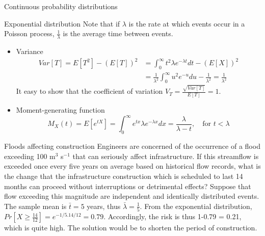 \documentclass[8pt]{beamer}
\renewcommand{\emph}[1]{\textcolor{myorange}{#1}}
\begin{document}
\begin{frame}{Continuous probability distributions}
    \begin{block}{\alert{Exponential} distribution}
                Note that if $\lambda$ is the rate at which events occur in a \emph{Poisson process}, $\frac{1}{\lambda}$ is the average time between events. 
       \begin{itemize}
            \item \emph{Variance}
                \vspace{-5pt}
         \begin{align*}
             \displaystyle
             Var[T] = E[T^2] - \left( E[T] \right)^2 &= \int_0^\infty t^2 \lambda e^{-\lambda t} dt - \left( E[X] \right)^2  \\
                                                     &= \frac{1}{\lambda^2} \int_0^\infty u^2 e^{-u} du - \frac{1}{\lambda^2} = \frac{1}{\lambda^2}
         \end{align*}
                \vspace{-5pt}
         It easy to show that  the \emph{coefficient of variation} $V_T = \frac{\sqrt{Var[T]}}{E[T]} = 1$.

    \item \emph{Moment-generating function}
                \vspace{-5pt}
\[
    M_X (t) = E \left[e^{tX} \right] = \int_0^\infty e^{tx} \lambda e^{-\lambda x} dx = \frac{\lambda}{\lambda - t}, \quad \text{for } t < \lambda 
\]
       \end{itemize}
    \end{block}
                \vspace{-10pt}
     \begin{exampleblock}{Floods affecting construction}
         Engineers are concerned of the occurrence of a flood exceeding 100 m$^3$ s$^{-1}$ that can seriously affect infrastructure. If this streamflow is exceeded once every five years on average based on historical flow records, what is the change that the infrastructure construction which is scheduled to last 14 months can proceed without interruptions or detrimental effects? 
         Suppose that flow exceeding this magnitude are independent and identically distributed events. The sample mean is $\bar{t} = 5$ years, thus $\bar{\lambda} = \frac{1}{5}$. From the exponential distribution, $Pr \left[ X \geq \frac{14}{12} \right] = e^{-1/5 . 14/12} = 0.79$. Accordingly, the risk is thus 1-0.79 = 0.21, which is quite high. The solution would be to shorten the period of construction. 
    \end{exampleblock}
\end{frame}
\end{document}
